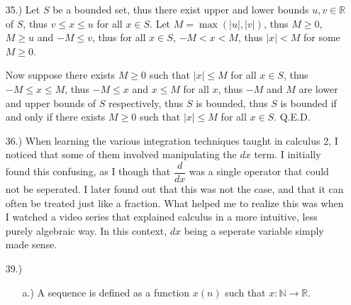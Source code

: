 \documentclass[12pt]{article}
\begin{document}
\begin{itemize}


    \item [35.)] Let $S$ be a bounded set, thus there exist upper and lower bounds $u,v\in\mathbb{R}$ of $S$, thus $v\leq x\leq u$ for all $x\in S$. Let $M=\max(\vert u\vert,\vert v\vert)$, thus $M\geq0$, $M\geq u$ and $-M\leq v$, thus for all $x\in S$, $-M<x<M$, thus $\vert x\vert<M$ for some $M\geq0$.

    Now suppose there exists $M\geq0$ such that $\vert x\vert\leq M$ for all $x\in S$, thus $-M\leq x\leq M$, thus $-M\leq x$ and $x\leq M$ for all $x$, thus $-M$ and $M$ are lower and upper bounds of $S$ respectively, thus $S$ is bounded, thus $S$ is bounded if and only if there exists $M\geq0$ such that $\vert x\vert\leq M$ for all $x\in S$. Q.E.D.

    \item [36.)] When learning the various integration techniques taught in calculus 2, I noticed that some of them involved manipulating the $dx$ term. I initially found this confusing, as I though that $\dfrac{d}{dx}$ was a single operator that could not be seperated. I later found out that this was not the case, and that it can often be treated just like a fraction. What helped me to realize this was when I watched a video series that explained calculus in a more intuitive, less purely algebraic way. In this context, $dx$ being a seperate variable simply made sense.



    \item [39.)] \begin{itemize}
        \item [a.)] A sequence is defined as a function $x(n)$ such that $x:\mathbb{N}\rightarrow\mathbb{R}$.


\end{itemize}
\end{itemize}
\end{document}
